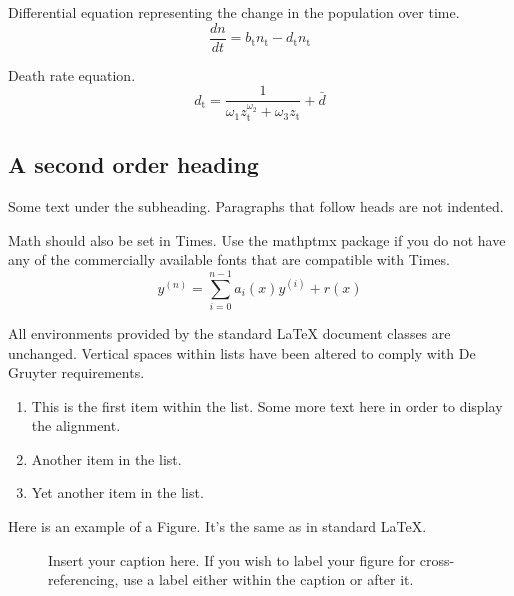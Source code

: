 \documentclass[letterpaper,12pt]{article}
\begin{document}
Differential equation representing the change in the population over time.
\begin{equation}
\frac{dn}{dt} = b_\mathrm{t} n_\mathrm{t} - d_\mathrm{t} n_\mathrm{t}
\end{equation}

Death rate equation.
\begin{equation} \label{deathrate}
d_\mathrm{t} = \frac{1}{\omega_\mathrm{1} z_\mathrm{t}^{\omega_\mathrm{2}} + \omega_\mathrm{3} z_\mathrm{t}} + \bar d
\end{equation}

\subsection{A second order heading}

Some text under the subheading. Paragraphs that follow heads are not
indented.

Math should also be set in Times. Use the mathptmx package if you do not have
any of the commercially available fonts that are compatible with Times.
\begin{equation}
    y^{(n)} = \sum_{i=0}^{n-1} a_i(x) y^{(i)} + r(x) 
\end{equation}

All environments provided by the standard LaTeX document classes are
unchanged. Vertical spaces within lists have been altered to comply with De Gruyter
requirements.
\begin{enumerate}
\item This is the first item within the list. Some more text here in order to
  display the alignment.
\item Another item in the list.
\item Yet another item in the list.
\end{enumerate}

Here is an example of a Figure. It's the same as in standard LaTeX.

\begin{figure}[!h]
\centering
\caption{Insert your caption here. If you wish to label your figure for
  cross-referencing, use a label either within the caption or after it.}
\label{fig1}
\end{figure}
\end{document}
